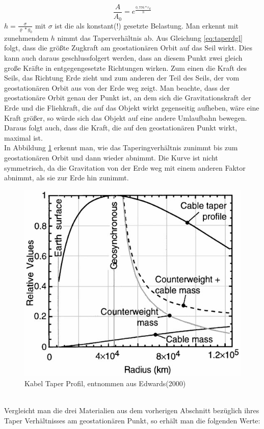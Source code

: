 \documentclass[a4paper, 10pt]{report}
\begin{document}
\begin{equation}
\frac{A}{A_0} = e^\frac{0,776*r_E}{h}
\label{eq:taperratio}
\end{equation}
$h=\frac{\sigma}{\varrho*g_0}$ mit $\sigma$ ist die als konstant(!) gesetzte Belastung. Man erkennt mit zunehmendem $h$ nimmt das Taperverhältnis ab.
Aus Gleichung \ref{eq:taperdgl} folgt, dass die größte Zugkraft am geostationären Orbit auf das Seil wirkt. Dies kann auch daraus geschlussfolgert werden, dass an diesem Punkt zwei gleich große Kräfte in entgegengesetzte Richtungen wirken. Zum einen die Kraft des Seils, das Richtung Erde zieht und zum anderen der Teil des Seils, der vom geostationären Orbit aus von der Erde weg zeigt. Man beachte, dass der geostationäre Orbit genau der Punkt ist, an dem sich die Gravitationskraft der Erde und die Fliehkraft, die auf das Objekt wirkt gegenseitig aufheben, wäre eine Kraft größer, so würde sich das Objekt auf eine andere Umlaufbahn bewegen. Daraus folgt auch, dass die Kraft, die auf den geostationären Punkt wirkt, maximal ist. \\
In Abbildung \ref{fig:Tapering} erkennt man, wie das Taperingverhältnis zunimmt bis zum geostationären Orbit und dann wieder abnimmt. Die Kurve ist nicht symmetrisch, da die Gravitation von der Erde weg mit einem anderen Faktor abnimmt, als sie zur Erde hin zunimmt.
\begin{figure}[!htb]
\centering
\includegraphics[scale=0.4]{Tapering.png} 
\caption{Kabel Taper Profil, entnommen aus Edwards(2000)\cite{ED00}}
\label{fig:Tapering}
\end{figure}
\\
Vergleicht man die drei Materialien aus dem vorherigen Abschnitt bezüglich ihres Taper Verhältnisses am geostationären Punkt, so erhält man die folgenden Werte:
\end{document}

